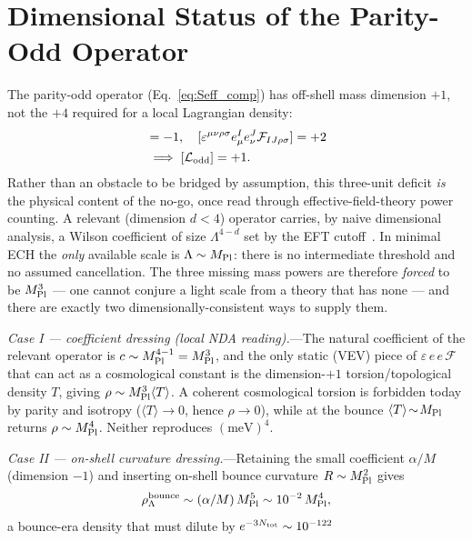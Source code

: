 \documentclass[aps,prd,twocolumn,superscriptaddress,showpacs,preprintnumbers,nofootinbib,longbibliography,floatfix]{revtex4-2}
\newcommand{\MPl}{M_{\rm Pl}}
\begin{document}
\section{Dimensional Status of the Parity-Odd Operator}\label{app:dimensions}

The parity-odd operator (Eq.~\ref{eq:Seff_comp}) has off-shell mass dimension
$+1$, not the $+4$ required for a local Lagrangian density:
\begin{align}
[\alpha/M] &= -1, \quad
[\varepsilon^{\mu\nu\rho\sigma}e^I_\mu e^J_\nu\mathcal{F}_{IJ\rho\sigma}] = +2 \nonumber\\
&\;\Longrightarrow\; [\mathcal{L}_{\rm odd}] = +1.
\end{align}
Rather than an obstacle to be bridged by assumption, this three-unit
deficit \emph{is} the physical content of the no-go, once read through
effective-field-theory power counting. A relevant (dimension $d<4$)
operator carries, by naive dimensional analysis, a Wilson coefficient of
size $\Lambda^{4-d}$ set by the EFT cutoff~\cite{Buchalla2013NDA,Brivio2017SMEFT,Isidori2023SMEFTReview}.
In minimal ECH the \emph{only} available scale is $\Lambda\sim\MPl$: there
is no intermediate threshold and no assumed cancellation. The three missing
mass powers are therefore \emph{forced} to be $\MPl^{3}$ --- one cannot
conjure a light scale from a theory that has none --- and there are exactly
two dimensionally-consistent ways to supply them.
\par
\textit{Case I --- coefficient dressing (local NDA reading).}---The natural
coefficient of the relevant operator is $c\sim\MPl^{4-1}=\MPl^{3}$, and the
only static (VEV) piece of $\varepsilon\,e\,e\,\mathcal{F}$ that can act as a
cosmological constant is the dimension-$+1$ torsion/topological density $T$,
giving $\rho\sim\MPl^{3}\langle T\rangle$. A coherent cosmological torsion is
forbidden today by parity and isotropy ($\langle T\rangle\!\to\!0$, hence
$\rho\!\to\!0$), while at the bounce $\langle T\rangle\!\sim\!\MPl$ returns
$\rho\sim\MPl^{4}$. Neither reproduces $(\text{meV})^{4}$.
\par
\textit{Case II --- on-shell curvature dressing.}---Retaining the small
coefficient $\alpha/M$ (dimension $-1$) and inserting on-shell bounce
curvature $R\sim\MPl^{2}$ gives
\begin{equation}
\rho_\Lambda^{\rm bounce}\sim(\alpha/M)\,\MPl^5 \sim 10^{-2}\,\MPl^4,
\label{eq:onshell_rho}
\end{equation}
a bounce-era density that must dilute by $e^{-3N_{\rm tot}}\sim10^{-122}$
\end{document}

